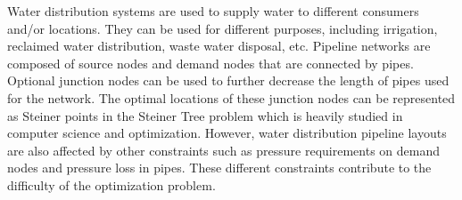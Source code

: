 Water distribution systems are used to supply water to different consumers and/or locations. They can be used for different purposes, including irrigation, reclaimed water distribution, waste water disposal, etc. Pipeline networks are composed of source nodes and demand nodes that are connected by pipes. Optional junction nodes can be used to further decrease the length of pipes used for the network. The optimal locations of these junction nodes can be represented as Steiner points in the Steiner Tree problem which is heavily studied in computer science and optimization. However, water distribution pipeline layouts are also affected by other constraints such as pressure requirements on demand nodes and pressure loss in pipes. These different constraints contribute to the difficulty of the optimization problem.